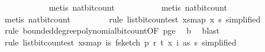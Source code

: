 \begin{isabellebody}
\ \ \ \ \ \ \ \ \ \ \isamarkupfalse%
\ {\isacharparenleft}{\kern0pt}metis\ nat{\isacharunderscore}{\kern0pt}bit{\isacharunderscore}{\kern0pt}count{\isacharparenright}{\kern0pt}\isanewline
\ \ \ \ \ \ \ \ \ \isamarkupfalse%
\ {\isacharparenleft}{\kern0pt}metis\ nat{\isacharunderscore}{\kern0pt}bit{\isacharunderscore}{\kern0pt}count{\isacharparenright}{\kern0pt}\isanewline
\ \ \ \ \ \ \ \ \isamarkupfalse%
\ {\isacharparenleft}{\kern0pt}metis\ nat{\isacharunderscore}{\kern0pt}bit{\isacharunderscore}{\kern0pt}count{\isacharparenright}{\kern0pt}\isanewline
\ \ \ \ \ \ \ \isamarkupfalse%
\ {\isacharparenleft}{\kern0pt}rule\ list{\isacharunderscore}{\kern0pt}bit{\isacharunderscore}{\kern0pt}count{\isacharunderscore}{\kern0pt}est{\isacharbrackleft}{\kern0pt}\ xs{\isacharequal}{\kern0pt}{\isachardoublequoteopen}map\ x\ {\isacharbrackleft}{\kern0pt}{}{\isachardot}{\kern0pt}{\isachardot}{\kern0pt}{\isacharless}{\kern0pt}s{\isacharbrackright}{\kern0pt}{\isachardoublequoteclose}{\isacharcomma}{\kern0pt}\ simplified{\isacharbrackright}{\kern0pt}{\isacharparenright}{\kern0pt}\isanewline
\ \ \ \ \ \ \ \isamarkupfalse%
\ {\isacharparenleft}{\kern0pt}rule\ bounded{\isacharunderscore}{\kern0pt}degree{\isacharunderscore}{\kern0pt}polynomial{\isacharunderscore}{\kern0pt}bit{\isacharunderscore}{\kern0pt}count{\isacharbrackleft}{\kern0pt}OF\ p{\isacharunderscore}{\kern0pt}ge{\isacharunderscore}{\kern0pt}{}{\isacharbrackright}{\kern0pt}{\isacharparenright}{\kern0pt}\ \isamarkupfalse%
\ b{\isacharunderscore}{\kern0pt}{}\ \isamarkupfalse%
\ blast\isanewline
\ \ \ \ \ \ \isamarkupfalse%
\ {\isacharparenleft}{\kern0pt}rule\ list{\isacharunderscore}{\kern0pt}bit{\isacharunderscore}{\kern0pt}count{\isacharunderscore}{\kern0pt}est{\isacharbrackleft}{\kern0pt}\ xs{\isacharequal}{\kern0pt}{\isachardoublequoteopen}map\ {\isacharparenleft}{\kern0pt}{\isasymlambda}i{\isasymin}{\isacharbraceleft}{\kern0pt}{}{\isachardot}{\kern0pt}{\isachardot}{\kern0pt}{\isacharless}{\kern0pt}s{\isacharbraceright}{\kern0pt}{\isachardot}{\kern0pt}\ f{}{\isacharunderscore}{\kern0pt}sketch\ p\ r\ t\ {\isacharparenleft}{\kern0pt}x\ i{\isacharparenright}{\kern0pt}\ as{\isacharparenright}{\kern0pt}\ {\isacharbrackleft}{\kern0pt}{}{\isachardot}{\kern0pt}{\isachardot}{\kern0pt}{\isacharless}{\kern0pt}s{\isacharbrackright}{\kern0pt}{\isachardoublequoteclose}{\isacharcomma}{\kern0pt}\ simplified{\isacharbrackright}{\kern0pt}{\isacharparenright}{\kern0pt}\isanewline

\end{isabellebody}
